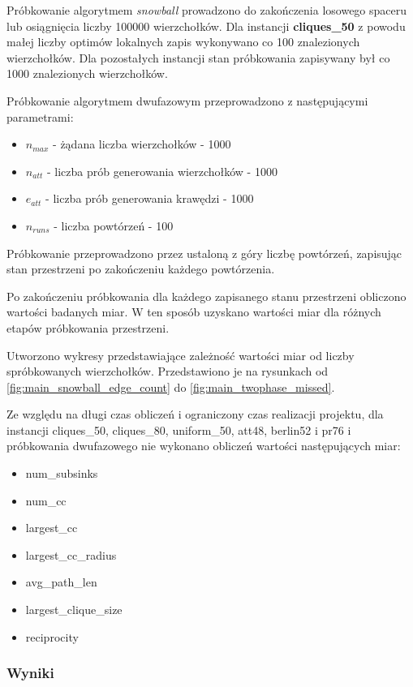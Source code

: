 Próbkowanie algorytmem \textit{snowball} prowadzono do zakończenia losowego spaceru lub osiągnięcia liczby 100000 wierzchołków.
Dla instancji \textbf{cliques\_50} z powodu małej liczby optimów lokalnych zapis wykonywano co 100 znalezionych wierzchołków.
Dla pozostałych instancji stan próbkowania zapisywany był co 1000 znalezionych wierzchołków.

Próbkowanie algorytmem dwufazowym przeprowadzono z następującymi parametrami:
\begin{itemize}
    \item $n_{max}$ - żądana liczba wierzchołków - 1000
    \item $n_{att}$ - liczba prób generowania wierzchołków - 1000
    \item $e_{att}$ - liczba prób generowania krawędzi - 1000
    \item $n_{runs}$ - liczba powtórzeń - 100
\end{itemize}

Próbkowanie przeprowadzono przez ustaloną z góry liczbę powtórzeń, zapisując stan przestrzeni po zakończeniu każdego powtórzenia.

Po zakończeniu próbkowania dla każdego zapisanego stanu przestrzeni obliczono wartości badanych miar. W ten sposób uzyskano
wartości miar dla różnych etapów próbkowania przestrzeni.

Utworzono wykresy przedstawiające zależność wartości miar od liczby spróbkowanych wierzchołków.
Przedstawiono je na rysunkach od \ref{fig:main_snowball_edge_count} do \ref{fig:main_twophase_missed}.

Ze względu na długi czas obliczeń i ograniczony czas realizacji projektu,
dla instancji cliques\_50, cliques\_80, uniform\_50, att48, berlin52 i pr76 i próbkowania dwufazowego
nie wykonano obliczeń wartości następujących miar:

\begin{itemize}
    \item num\_subsinks
    \item num\_cc
    \item largest\_cc
    \item largest\_cc\_radius
    \item avg\_path\_len
    \item largest\_clique\_size
    \item reciprocity
\end{itemize}

\subsubsection{Wyniki}

